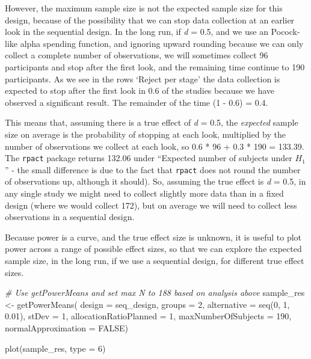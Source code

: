 \documentclass[
  oneside]{krantz}
\makeatletter
\newenvironment{Shaded}{\begin{snugshade}}{\end{snugshade}}
\newcommand{\AttributeTok}[1]{\textcolor[rgb]{0.61,0.61,0.61}{#1}}
\newcommand{\CommentTok}[1]{\textcolor[rgb]{0.37,0.37,0.37}{\textit{#1}}}
\newcommand{\ConstantTok}[1]{\textcolor[rgb]{0,0,0}{#1}}
\newcommand{\DecValTok}[1]{\textcolor[rgb]{0.06,0.06,0.06}{#1}}
\newcommand{\FloatTok}[1]{\textcolor[rgb]{0.06,0.06,0.06}{#1}}
\newcommand{\FunctionTok}[1]{\textcolor[rgb]{0,0,0}{#1}}
\newcommand{\NormalTok}[1]{#1}
\newcommand{\OtherTok}[1]{\textcolor[rgb]{0.37,0.37,0.37}{#1}}
\newenvironment{kframe}{%
\medskip{}
\setlength{\fboxsep}{.8em}
 \def\at@end@of@kframe{}%
 \ifinner\ifhmode%
  \def\at@end@of@kframe{\end{minipage}}%
  \begin{minipage}{\columnwidth}%
 \fi\fi%
 \def\FrameCommand##1{\hskip\@totalleftmargin \hskip-\fboxsep
 \colorbox{shadecolor}{##1}\hskip-\fboxsep
     \hskip-\linewidth \hskip-\@totalleftmargin \hskip\columnwidth}%
 \MakeFramed {\advance\hsize-\width
   \@totalleftmargin\z@ \linewidth\hsize
   \@setminipage}}%
 {\par\unskip\endMakeFramed%
 \at@end@of@kframe}
\renewenvironment{Shaded}{\begin{kframe}}{\end{kframe}}
\makeatother
\begin{document}
However, the maximum sample size is not the expected sample size for this design, because of the possibility that we can stop data collection at an earlier look in the sequential design. In the long run, if \emph{d} = 0.5, and we use an Pocock-like alpha spending function, and ignoring upward rounding because we can only collect a complete number of observations, we will sometimes collect 96 participants and stop after the first look, and the remaining time continue to 190 participants. As we see in the rows `Reject per stage' the data collection is expected to stop after the first look in 0.6 of the studies because we have observed a significant result. The remainder of the time (1 - 0.6) = 0.4.

This means that, assuming there is a true effect of \emph{d} = 0.5, the \emph{expected} sample size on average is the probability of stopping at each look, multiplied by the number of observations we collect at each look, so 0.6 * 96 + 0.3 * 190 = 133.39. The \texttt{rpact} package returns 132.06 under ``Expected number of subjects under \(H_1\)'' - the small difference is due to the fact that \texttt{rpact} does not round the number of observations up, although it should). So, assuming the true effect is \emph{d} = 0.5, in any single study we might need to collect slightly more data than in a fixed design (where we would collect 172), but on average we will need to collect less observations in a sequential design.

Because power is a curve, and the true effect size is unknown, it is useful to plot power across a range of possible effect sizes, so that we can explore the expected sample size, in the long run, if we use a sequential design, for different true effect sizes.



\begin{Shaded}
\begin{Highlighting}[]
\CommentTok{\# Use getPowerMeans and set max N to 188 based on analysis above}
\NormalTok{sample\_res }\OtherTok{\textless{}{-}} \FunctionTok{getPowerMeans}\NormalTok{(}
  \AttributeTok{design =}\NormalTok{ seq\_design,}
  \AttributeTok{groups =} \DecValTok{2}\NormalTok{,}
  \AttributeTok{alternative =} \FunctionTok{seq}\NormalTok{(}\DecValTok{0}\NormalTok{, }\DecValTok{1}\NormalTok{, }\FloatTok{0.01}\NormalTok{), }
  \AttributeTok{stDev =} \DecValTok{1}\NormalTok{, }
  \AttributeTok{allocationRatioPlanned =} \DecValTok{1}\NormalTok{,}
  \AttributeTok{maxNumberOfSubjects =} \DecValTok{190}\NormalTok{, }
  \AttributeTok{normalApproximation =} \ConstantTok{FALSE}\NormalTok{)}

\FunctionTok{plot}\NormalTok{(sample\_res, }\AttributeTok{type =} \DecValTok{6}\NormalTok{)}
\end{Highlighting}
\end{Shaded}
\end{document}
